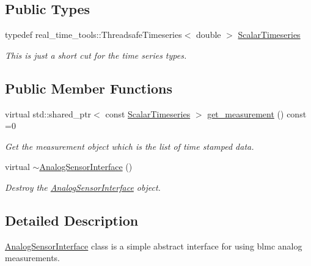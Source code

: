 \subsection*{Public Types}
\begin{DoxyCompactItemize}
\item 
typedef real\+\_\+time\+\_\+tools\+::\+Threadsafe\+Timeseries$<$ double $>$ \hyperlink{classblmc__drivers_1_1AnalogSensorInterface_a4e4a853aa044b7d3afbaa3fe20477602}{Scalar\+Timeseries}\hypertarget{classblmc__drivers_1_1AnalogSensorInterface_a4e4a853aa044b7d3afbaa3fe20477602}{}\label{classblmc__drivers_1_1AnalogSensorInterface_a4e4a853aa044b7d3afbaa3fe20477602}

\begin{DoxyCompactList}\small\item\em This is just a short cut for the time series types. \end{DoxyCompactList}\end{DoxyCompactItemize}
\subsection*{Public Member Functions}
\begin{DoxyCompactItemize}
\item 
virtual std\+::shared\+\_\+ptr$<$ const \hyperlink{classblmc__drivers_1_1AnalogSensorInterface_a4e4a853aa044b7d3afbaa3fe20477602}{Scalar\+Timeseries} $>$ \hyperlink{classblmc__drivers_1_1AnalogSensorInterface_afd694f79c9fec5a35984d468f59f315c}{get\+\_\+measurement} () const =0
\begin{DoxyCompactList}\small\item\em Get the measurement object which is the list of time stamped data. \end{DoxyCompactList}\item 
virtual \hyperlink{classblmc__drivers_1_1AnalogSensorInterface_a809cd9b86ae1cb9119a2ad025163afa9}{$\sim$\+Analog\+Sensor\+Interface} ()
\begin{DoxyCompactList}\small\item\em Destroy the \hyperlink{classblmc__drivers_1_1AnalogSensorInterface}{Analog\+Sensor\+Interface} object. \end{DoxyCompactList}\end{DoxyCompactItemize}


\subsection{Detailed Description}
\hyperlink{classblmc__drivers_1_1AnalogSensorInterface}{Analog\+Sensor\+Interface} class is a simple abstract interface for using blmc analog measurements. 

